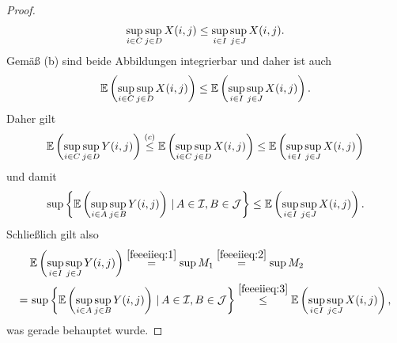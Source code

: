 \begin{proof}
\[\sup_{i\in C}\sup_{j\in D}X(i,j)\le\sup_{i\in I}\sup_{j \in J}X(i,j)\text.\]
Gemäß (b) sind beide Abbildungen integrierbar und daher ist auch
\[\mathbb{E}\left(\sup_{i \in C} \sup_{j \in D}X(i, j) \right)
\le \mathbb{E}\left(\sup_{i \in I} \sup_{j \in J}X(i, j) \right)\text.\]
Daher gilt
\[\mathbb{E}\left(\sup_{i \in C} \sup_{j \in D}Y(i, j) \right)
\overset{(c)}\le\mathbb{E}\left(\sup_{i \in C} \sup_{j \in D}X(i, j) \right)
\le \mathbb{E}\left(\sup_{i \in I} \sup_{j \in J}X(i, j) \right)\]
und damit
\begin{align}
\sup\left\{\mathbb{E}\left(\sup_{i \in A} \sup_{j \in B}Y(i, j) \right)\,|\,A \in \mathcal{I}, B \in \mathcal{J}\right\} \le
            \mathbb{E}\left(\sup_{i \in I} \sup_{j \in J}X(i, j) \right)\text.
            \label{feeeiieq:3}
\end{align}
Schließlich gilt also
\begin{align*}
&\,\mathbb{E}\left(\sup_{i \in I}\sup_{j \in J}Y(i,j)\right)
\overset{\eqref{feeeiieq:1}}=
\sup M_1 \overset{\eqref{feeeiieq:2}}= \sup M_2\\
= &\, \sup \left\{\mathbb{E}\left(\sup_{i \in A}\sup_{j \in B}Y(i,j) \right)\,|\,A \in \mathcal{I}, B \in \mathcal{J}\right\}
 \overset{\eqref{feeeiieq:3}}\le
 \mathbb{E}\left(\sup_{i\in I}\sup_{j \in J}X(i, j) \right)\text,
\end{align*}
was gerade behauptet wurde.
\end{proof}